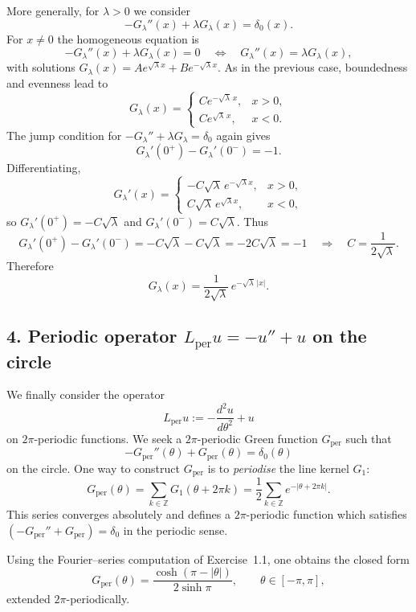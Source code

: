 \documentclass[12pt,a4paper]{article}
\theoremstyle{plain}
\theoremstyle{definition}
\theoremstyle{remark}
\theoremstyle{remark}
\begin{document}
More generally, for $\lambda>0$ we consider
\[
-G_\lambda''(x) + \lambda G_\lambda(x) = \delta_0(x).
\]
For $x\neq 0$ the homogeneous equation is
\[
-G_\lambda''(x) + \lambda G_\lambda(x) = 0
\quad\Longleftrightarrow\quad
G_\lambda''(x) = \lambda G_\lambda(x),
\]
with solutions $G_\lambda(x)=A e^{\sqrt{\lambda} x}
+ B e^{-\sqrt{\lambda} x}$.  As in the previous case, boundedness and
evenness lead to
\[
G_\lambda(x) =
\begin{cases}
	C e^{-\sqrt{\lambda}\,x}, & x>0,\\
	C e^{\sqrt{\lambda}\,x},  & x<0.
\end{cases}
\]
The jump condition for $-G_\lambda''+\lambda G_\lambda=\delta_0$
again gives
\[
G_\lambda'(0^+)-G_\lambda'(0^-) = -1.
\]
Differentiating,
\[
G_\lambda'(x) =
\begin{cases}
	-C\sqrt{\lambda}\,e^{-\sqrt{\lambda}x}, & x>0,\\[0.3em]
	C\sqrt{\lambda}\,e^{\sqrt{\lambda}x},   & x<0,
\end{cases}
\]
so $G_\lambda'(0^+) = -C\sqrt{\lambda}$ and
$G_\lambda'(0^-) = C\sqrt{\lambda}$.  Thus
\[
G_\lambda'(0^+)-G_\lambda'(0^-)
= -C\sqrt{\lambda} - C\sqrt{\lambda}
= -2C\sqrt{\lambda}
= -1
\quad\Longrightarrow\quad
C = \frac{1}{2\sqrt{\lambda}}.
\]
Therefore
\[
G_\lambda(x) = \frac{1}{2\sqrt{\lambda}}\,e^{-\sqrt{\lambda}\,|x|}.
\]

\subsection*{4. Periodic operator $L_{\mathrm{per}}u = -u''+u$ on the circle}

We finally consider the operator
\[
L_{\mathrm{per}}u := -\frac{d^2 u}{d\theta^2} + u
\]
on $2\pi$-periodic functions.  We seek a $2\pi$-periodic Green function
$G_{\mathrm{per}}$ such that
\[
-G_{\mathrm{per}}''(\theta) + G_{\mathrm{per}}(\theta)
= \delta_0(\theta)
\]
on the circle.  One way to construct $G_{\mathrm{per}}$ is to
\emph{periodise} the line kernel $G_1$:
\[
G_{\mathrm{per}}(\theta)
= \sum_{k\in\mathbb{Z}} G_1(\theta+2\pi k)
= \frac12 \sum_{k\in\mathbb{Z}} e^{-|\theta+2\pi k|}.
\]
This series converges absolutely and defines a $2\pi$-periodic function
which satisfies $(-G_{\mathrm{per}}''+G_{\mathrm{per}})=\delta_0$ in the
periodic sense.

Using the Fourier–series computation of Exercise~1.1, one obtains the
closed form
\[
G_{\mathrm{per}}(\theta)
= \frac{\cosh(\pi-|\theta|)}{2\sinh\pi},
\qquad \theta\in[-\pi,\pi],
\]
extended $2\pi$-periodically.
\end{document}
